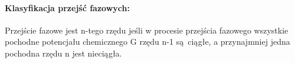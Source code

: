 \documentclass{article}
\begin{document}
		\paragraph{Klasyfikacja przejść fazowych:}
		Przejście fazowe jest n-tego rzędu jeśli w procesie przejścia fazowego wszystkie pochodne potencjału chemicznego G rzędu n-1 są ciągłe, a przynajmniej jedna pochodna rzędu n jest nieciągła.
		
		
		
		
		
		
		
		
\end{document}
